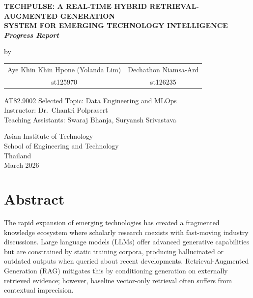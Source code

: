 \documentclass[12pt,a4paper]{report}
\begin{document}

\begin{titlepage}
\begin{center}
\vspace*{0.5cm}
{\fontsize{14}{18}\bfseries\MakeUppercase{%
TechPulse: A Real-Time Hybrid Retrieval-Augmented Generation\\
System for Emerging Technology Intelligence}\\[4pt]
\normalsize\mdseries\textit{Progress Report}}

\vspace{1.8cm}
{\normalsize by}

    \vspace{1em}

    \begin{tabular}{cc}
        Aye Khin Khin Hpone (Yolanda Lim) & Dechathon Niamsa-Ard \\
        {\small st125970} & {\small st126235}
    \end{tabular}

\vfill

{\normalsize AT82.9002 Selected Topic: Data Engineering and MLOps}\\[6pt]
{\normalsize Instructor: Dr.\ Chantri Polprasert}\\[4pt]
{\normalsize Teaching Assistants: Swaraj Bhanja, Suryansh Srivastava}

\vfill
{\normalsize
Asian Institute of Technology\\[4pt]
School of Engineering and Technology\\[4pt]
Thailand\\[8pt]
March 2026
}
\end{center}
\end{titlepage}

\chapter*{Abstract}

The rapid expansion of emerging technologies has created a fragmented knowledge ecosystem where scholarly research coexists with fast-moving industry discussions. Large language models (LLMs) offer advanced generative capabilities but are constrained by static training corpora, producing hallucinated or outdated outputs when queried about recent developments. Retrieval-Augmented Generation (RAG) mitigates this by conditioning generation on externally retrieved evidence; however, baseline vector-only retrieval often suffers from contextual imprecision.
\end{document}
